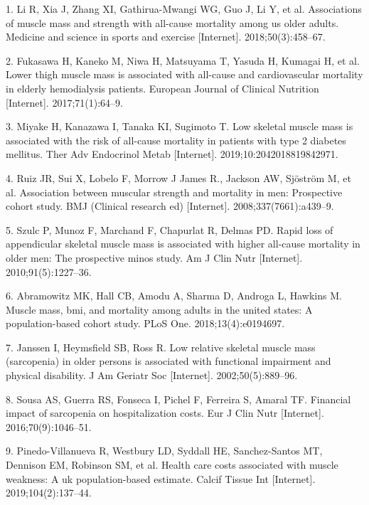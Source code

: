 \documentclass[twoside,10pt]{gihclass} %
\begin{document}
\setlength{\parindent}{-0.20in}
\setlength{\leftskip}{0.20in}
\setlength{\parskip}{8pt}

\hypertarget{refs}{}
\leavevmode\hypertarget{ref-RN2512}{}%
1. Li R, Xia J, Zhang XI, Gathirua-Mwangi WG, Guo J, Li Y, et al. Associations of muscle mass and strength with all-cause mortality among us older adults. Medicine and science in sports and exercise {[}Internet{]}. 2018;50(3):458--67.

\leavevmode\hypertarget{ref-RN2513}{}%
2. Fukasawa H, Kaneko M, Niwa H, Matsuyama T, Yasuda H, Kumagai H, et al. Lower thigh muscle mass is associated with all-cause and cardiovascular mortality in elderly hemodialysis patients. European Journal of Clinical Nutrition {[}Internet{]}. 2017;71(1):64--9.

\leavevmode\hypertarget{ref-RN2514}{}%
3. Miyake H, Kanazawa I, Tanaka KI, Sugimoto T. Low skeletal muscle mass is associated with the risk of all-cause mortality in patients with type 2 diabetes mellitus. Ther Adv Endocrinol Metab {[}Internet{]}. 2019;10:2042018819842971.

\leavevmode\hypertarget{ref-RN2376}{}%
4. Ruiz JR, Sui X, Lobelo F, Morrow J James R., Jackson AW, Sjöström M, et al. Association between muscular strength and mortality in men: Prospective cohort study. BMJ (Clinical research ed) {[}Internet{]}. 2008;337(7661):a439--9.

\leavevmode\hypertarget{ref-RN2515}{}%
5. Szulc P, Munoz F, Marchand F, Chapurlat R, Delmas PD. Rapid loss of appendicular skeletal muscle mass is associated with higher all-cause mortality in older men: The prospective minos study. Am J Clin Nutr {[}Internet{]}. 2010;91(5):1227--36.

\leavevmode\hypertarget{ref-RN2516}{}%
6. Abramowitz MK, Hall CB, Amodu A, Sharma D, Androga L, Hawkins M. Muscle mass, bmi, and mortality among adults in the united states: A population-based cohort study. PLoS One. 2018;13(4):e0194697.

\leavevmode\hypertarget{ref-RN2517}{}%
7. Janssen I, Heymsfield SB, Ross R. Low relative skeletal muscle mass (sarcopenia) in older persons is associated with functional impairment and physical disability. J Am Geriatr Soc {[}Internet{]}. 2002;50(5):889--96.

\leavevmode\hypertarget{ref-RN2532}{}%
8. Sousa AS, Guerra RS, Fonseca I, Pichel F, Ferreira S, Amaral TF. Financial impact of sarcopenia on hospitalization costs. Eur J Clin Nutr {[}Internet{]}. 2016;70(9):1046--51.

\leavevmode\hypertarget{ref-RN2184}{}%
9. Pinedo-Villanueva R, Westbury LD, Syddall HE, Sanchez-Santos MT, Dennison EM, Robinson SM, et al. Health care costs associated with muscle weakness: A uk population-based estimate. Calcif Tissue Int {[}Internet{]}. 2019;104(2):137--44.
\end{document}
